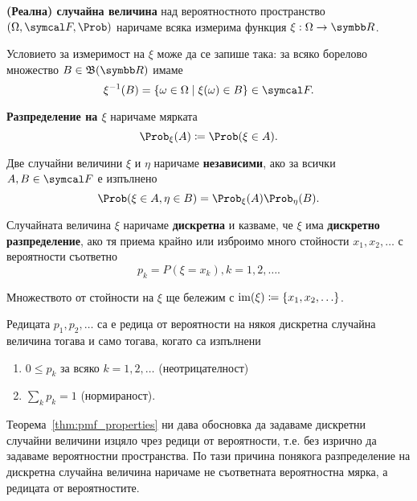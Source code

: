 \documentclass[numbers=endperiod, bibliography=totocnumbered]{scrartcl}
\begin{document}
\begin{definition}
  \textbf{(Реална) случайна величина} над вероятностното пространство \( (\Omega, \F, \Prob) \) наричаме всяка измерима функция \( \xi : \Omega \to \R \).

  Условието за измеримост на \( \xi \) може да се запише така: за всяко борелово множество \( B \in \BorelAlgebra(\R) \) имаме
  \begin{equation*}
    \xi^{-1} (B) = \{ \omega \in \Omega \mid \xi(\omega) \in B \} \in \F.
  \end{equation*}

  \textbf{Разпределение на \( \xi \)} наричаме мярката
  \begin{equation*}
    \Prob_\xi(A) \coloneqq \Prob(\xi \in A).
  \end{equation*}

  Две случайни величини \( \xi \) и \( \eta \) наричаме \textbf{независими}, ако за всички \( A, B \in \F \) е изпълнено
  \begin{equation*}
    \Prob(\xi \in A, \eta \in B) = \Prob_\xi(A) \Prob_\eta(B).
  \end{equation*}

  Случайната величина \( \xi \) наричаме \textbf{дискретна} и казваме, че \( \xi \) има \textbf{дискретно разпределение}, ако тя приема крайно или изброимо много стойности \( x_1, x_2, \ldots \) с вероятности съответно
  \begin{equation*}
    p_k = P(\xi = x_k), k = 1, 2, \ldots.
  \end{equation*}

  Множеството от стойности на \( \xi \) ще бележим с \( \operatorname{im}(\xi) \coloneqq \{ x_1, x_2, \ldots \} \).
\end{definition}

\begin{theorem}\label{thm:pmf_properties}
  Редицата \( p_1, p_2, \ldots \) са е редица от вероятности на някоя дискретна случайна величина тогава и само тогава, когато са изпълнени
  \begin{enumerate}
    \item\label{thm:pmf_properties/bounded} \( 0 \leq p_k \) за всяко \( k = 1, 2, \ldots \) (неотрицателност)
    \item\label{thm:pmf_properties/normed} \( \sum_k p_k = 1 \) (нормираност).
  \end{enumerate}
\end{theorem}

Теорема~\ref{thm:pmf_properties} ни дава обосновка да задаваме дискретни случайни величини изцяло чрез редици от вероятности, т.е. без изрично да задаваме вероятностни пространства. По тази причина понякога разпределение на дискретна случайна величина наричаме не съответната вероятностна мярка, а редицата от вероятностите.
\end{document}
